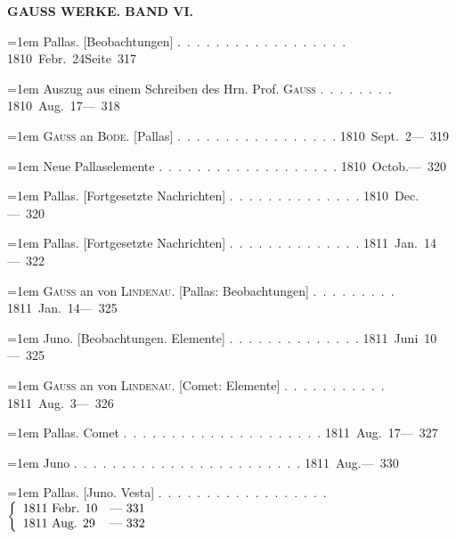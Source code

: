 \clearpage
{}
\noindent{}%
\parbox[b]{\dimexpr\textwidth-20mm\relax}{\centering\small\textbf{GAUSS WERKE. BAND VI.}}%
\makebox[10mm][r]{}\par\nobreak\medskip
\begingroup
\raggedright
\noindent\hangindent=1em Pallas. [Beobachtungen] \mbox{.\ .\ .\ .\ .\ .\ .\ .\ .\ .\ .\ .\ .\ .\ .\ .\ .\ .} \hfill\mbox{1810 Febr. 24}\quad\mbox{Seite 317}\par\smallskip
\noindent\hangindent=1em Auszug aus einem Schreiben des Hrn. Prof. \textsc{Gauss} \mbox{.\ .\ .\ .\ .\ .\ .\ .} \hfill\mbox{1810 Aug. 17}\quad\mbox{--- 318}\par\smallskip
\noindent\hangindent=1em \textsc{Gauss} an \textsc{Bode}. [Pallas] \mbox{.\ .\ .\ .\ .\ .\ .\ .\ .\ .\ .\ .\ .\ .\ .\ .\ .} \hfill\mbox{1810 Sept. 2}\quad\mbox{--- 319}\par\smallskip
\noindent\hangindent=1em Neue Pallaselemente \mbox{.\ .\ .\ .\ .\ .\ .\ .\ .\ .\ .\ .\ .\ .\ .\ .\ .\ .\ .} \hfill\mbox{1810 Octob.}\quad\mbox{--- 320}\par\smallskip
\noindent\hangindent=1em Pallas. [Fortgesetzte Nachrichten] \mbox{.\ .\ .\ .\ .\ .\ .\ .\ .\ .\ .\ .\ .\ .} \hfill\mbox{1810 Dec.}\quad\mbox{--- 320}\par\smallskip
\noindent\hangindent=1em Pallas. [Fortgesetzte Nachrichten] \mbox{.\ .\ .\ .\ .\ .\ .\ .\ .\ .\ .\ .\ .\ .} \hfill\mbox{1811 Jan. 14}\quad\mbox{--- 322}\par\smallskip
\noindent\hangindent=1em \textsc{Gauss} an von \textsc{Lindenau}. [Pallas: Beobachtungen] \mbox{.\ .\ .\ .\ .\ .\ .\ .\ .} \hfill\mbox{1811 Jan. 14}\quad\mbox{--- 325}\par\smallskip
\noindent\hangindent=1em Juno. [Beobachtungen. Elemente] \mbox{.\ .\ .\ .\ .\ .\ .\ .\ .\ .\ .\ .\ .\ .} \hfill\mbox{1811 Juni 10}\quad\mbox{--- 325}\par\smallskip
\noindent\hangindent=1em \textsc{Gauss} an von \textsc{Lindenau}. [Comet: Elemente] \mbox{.\ .\ .\ .\ .\ .\ .\ .\ .\ .\ .} \hfill\mbox{1811 Aug. 3}\quad\mbox{--- 326}\par\smallskip
\noindent\hangindent=1em Pallas. Comet \mbox{.\ .\ .\ .\ .\ .\ .\ .\ .\ .\ .\ .\ .\ .\ .\ .\ .\ .\ .\ .\ .} \hfill\mbox{1811 Aug. 17}\quad\mbox{--- 327}\par\smallskip
\noindent\hangindent=1em Juno \mbox{.\ .\ .\ .\ .\ .\ .\ .\ .\ .\ .\ .\ .\ .\ .\ .\ .\ .\ .\ .\ .\ .\ .\ .} \hfill\mbox{1811 Aug.}\quad\mbox{--- 330}\par\smallskip
\noindent\hangindent=1em Pallas. [Juno. Vesta] \mbox{.\ .\ .\ .\ .\ .\ .\ .\ .\ .\ .\ .\ .\ .\ .\ .\ .\ .} \hfill\mbox{$\left\{\begin{array}{l@{\quad}l}\text{1811 Febr. 10}&\text{— 331}\\\text{1811 Aug. 29}&\text{— 332}\end{array}\right.$}\par\smallskip
